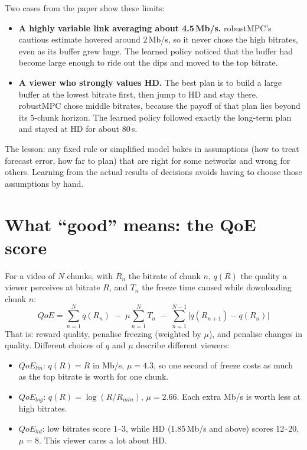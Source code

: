 Two cases from the paper show these limits:
\begin{itemize}
  \item \textbf{A highly variable link averaging about 4.5\,Mb/s.} robustMPC's cautious estimate hovered around 2\,Mb/s, so it never chose the high
        bitrates, even as its buffer grew huge. The learned policy noticed that the buffer had become large enough to ride out the dips and moved to the
        top bitrate.
  \item \textbf{A viewer who strongly values HD.} The best plan is to build a large buffer at the lowest bitrate first, then jump to HD and stay there. robustMPC
        chose middle bitrates, because the payoff of that plan lies beyond its 5-chunk horizon. The learned policy followed exactly the long-term plan and
        stayed at HD for about 80\,s.
\end{itemize}
The lesson: any fixed rule or simplified model bakes in assumptions (how to treat forecast error, how far to plan) that are right for some networks and
wrong for others. Learning from the actual results of decisions avoids having to choose those assumptions by hand.

\section{What ``good'' means: the QoE score}

For a video of $N$ chunks, with $R_n$ the bitrate of chunk $n$, $q(R)$ the quality a viewer perceives at bitrate $R$, and $T_n$ the freeze time
caused while downloading chunk $n$:
\[
  QoE = \sum_{n=1}^{N} q(R_n) \;-\; \mu \sum_{n=1}^{N} T_n \;-\; \sum_{n=1}^{N-1} \big|q(R_{n+1}) - q(R_n)\big|
\]
That is: reward quality, penalise freezing (weighted by $\mu$), and penalise changes in quality. Different choices of $q$ and $\mu$ describe different viewers:
\begin{itemize}
  \item $QoE_{lin}$: $q(R) = R$ in Mb/s, $\mu = 4.3$, so one second of freeze costs as much as the top bitrate is worth for one chunk.
  \item $QoE_{log}$: $q(R) = \log(R/R_{min})$, $\mu = 2.66$. Each extra Mb/s is worth less at high bitrates.
  \item $QoE_{hd}$: low bitrates score 1--3, while HD (1.85\,Mb/s and above) scores 12--20, $\mu = 8$. This viewer cares a lot about HD.
\end{itemize}

